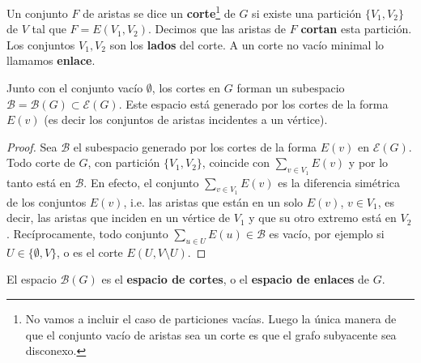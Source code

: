 \documentclass[../main.tex]{subfiles}
\begin{document}
\begin{definition}
Un conjunto $F$ de aristas se dice un \textbf{corte}\footnote{No vamos a incluir el caso de particiones vacías. Luego la única manera de que el conjunto vacío de aristas sea un corte es que el grafo subyacente sea disconexo.}
 de $G$ si existe una partición $\{V_1,V_2\}$ de $V$ tal que $F = E(V_1,V_2)$. Decimos que las aristas de $F$ \textbf{cortan} esta partición. Los conjuntos $V_1,V_2$ son los \textbf{lados} del corte. A un corte no vacío minimal lo llamamos \textbf{enlace}.
\end{definition}

\begin{proposition}
Junto con el conjunto vacío $\emptyset$, los cortes en $G$ forman un subespacio $\mathcal B = \mathcal B ( G) \subset \mathcal{E}(G)$. Este espacio está generado por los cortes de la forma $E(v)$ (es decir los conjuntos de aristas incidentes a un vértice).
\end{proposition}
\begin{proof}
Sea $\mathcal B$ el subespacio generado por los cortes de la forma $E(v)$ en $\mathcal{E} (G)$. Todo corte de $G$, con partición $\{ V_1 , V_2 \}$, coincide con $\sum_{v \in V_1} E(v)$ y por lo tanto está en $\mathcal{B}$. En efecto, el conjunto $\sum_{v \in V_1} E(v)$ es la diferencia simétrica de los conjuntos $E(v)$, i.e. las aristas que están en un solo $E(v)$, $v  \in V_1$, es decir, las aristas que inciden en un vértice de $V_1$ y que su otro extremo está en $V_2$. Recíprocamente, todo conjunto $\sum_{u \in U}E(u) \in \mathcal{B}$ es vacío, por ejemplo si $U \in \{ \emptyset , V \}$, o es el corte $E(U, V \setminus U)$.
\end{proof}

\begin{definition}
El espacio $\mathcal{B} (G)$ es el \textbf{espacio de cortes}, o el \textbf{espacio de enlaces} de $G$.
\end{definition}
\end{document}
